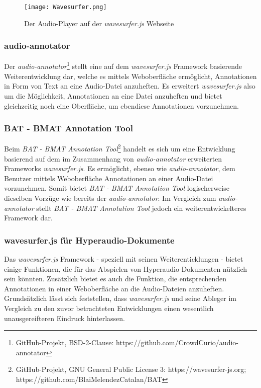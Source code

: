 \begin{figure}[h!]
\texttt{[image: Wavesurfer.png]}
\caption{\label{fig:Wavesurfer} Der Audio-Player auf der \textit{wavesurfer.js} Webseite\citep{wavesurfer}}
\end{figure}


\subsubsection{audio-annotator}
Der \textit{audio-annotator}\footnote{GitHub-Projekt, BSD-2-Clause: https://github.com/CrowdCurio/audio-annotator} stellt eine auf dem \textit{wavesurfer.js} Framework basierende Weiterentwicklung dar, welche es mittels Weboberfläche ermöglicht, Annotationen in Form von Text an eine Audio-Datei anzuheften. Es erweitert \textit{wavesurfer.js} also um die Möglichkeit, Annotationen an eine Datei anzuheften und bietet gleichzeitig noch eine Oberfläche, um ebendiese Annotationen vorzunehmen.

\subsubsection{BAT - BMAT Annotation Tool}
Beim \textit{BAT - BMAT Annotation Tool}\footnote{GitHub-Projekt, GNU General Public License 3: https://wavesurfer-js.org; https://github.com/BlaiMelendezCatalan/BAT} handelt es sich um eine Entwicklung basierend auf dem im Zusammenhang von \textit{audio-annotator} erweiterten Frameworks \textit{wavesurfer.js}. Es ermöglicht, ebenso wie \textit{audio-annotator}, dem Benutzer mittels Weboberfläche Annotationen an einer Audio-Datei vorzunehmen. Somit bietet \textit{BAT - BMAT Annotation Tool} logischerweise dieselben Vorzüge wie bereits der \textit{audio-annotator}. Im Vergleich zum \textit{audio-annotator} stellt \textit{BAT - BMAT Annotation Tool} jedoch ein weiterentwickelteres Framework dar.

\subsubsection{wavesurfer.js für Hyperaudio-Dokumente}
Das \textit{wavesurfer.js} Framework - speziell mit seinen Weiterenticklungen - bietet einige Funktionen, die für das Abspielen von Hyperaudio-Dokumenten nützlich sein könnten. Zusätzlich bietet es auch die Funktion,  die entsprechenden Annotationen in einer Weboberfläche an die Audio-Dateien anzuheften. Grundsätzlich lässt sich feststellen, dass \textit{wavesurfer.js} und seine Ableger im Vergleich zu den zuvor betrachteten Entwicklungen einen wesentlich unausgereifteren Eindruck hinterlassen.

